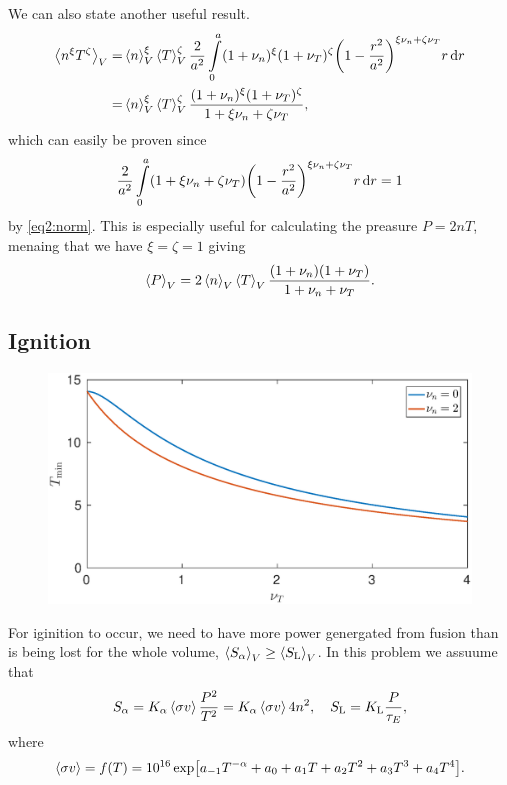 \documentclass[11pt,a4paper, 
swedish, english %
]{article}
\begin{document}
We can also state another useful result.
\begin{equation}
\begin{aligned}
\ev{n^\xi T^\zeta}_V=&\ev{n}_V^\xi\ev{T}_V^\zeta
\frac{2}{a^2}\int_0^a(1+\nu_n)^\xi(1+\nu_T)^\zeta
\qty(1-\frac{r^2}{a^2})^{\xi\nu_n+\zeta\nu_T}r\id{r}\\
=&\ev{n}_V^\xi\ev{T}_V^\zeta
\frac{(1+\nu_n)^\xi(1+\nu_T)^\zeta}{1+\xi\nu_n+\zeta\nu_T},
\end{aligned}
\end{equation}
which can easily be proven since
\begin{equation}
\frac{2}{a^2}\int_0^a(1+\xi\nu_n+\zeta\nu_T)
\qty(1-\frac{r^2}{a^2})^{\xi\nu_n+\zeta\nu_T}r\id{r}
=1
\end{equation}
by \eqref{eq2:norm}.
This is especially useful for calculating the preasure $P=2nT$,
menaing that we have $\xi=\zeta=1$ giving
\begin{equation}\label{eq2:P}
\ev{P}_V=2\ev{n}_V\ev{T}_V
\frac{(1+\nu_n)(1+\nu_T)}{1+\nu_n+\nu_T}.
\end{equation}


\subsection*{Ignition}
\begin{figure}
\centering
\includegraphics[width=14cm]{T_min.eps}
\caption{}
\label{fig:T_min}
\end{figure}

For iginition to occur, we need to have more power genergated from
fusion than is being lost for the whole volume,
$\ev{S_\alpha}_V\ge\ev{S_\text{L}}_V$. In this problem we assuume that
\begin{equation}
S_\alpha = K_\alpha\ev{\sigma v}\frac{P^2}{T^2}
= K_\alpha\ev{\sigma v} 4n^2 \qc
S_\text{L} = K_\text{L} \frac{P}{\tau_E},
\end{equation}
where
\begin{equation}\label{eq:sigma_v}
\ev{\sigma v} = f(T) = 10^{16}
\exp[a_{-1}T^{-\alpha} +a_0 +a_1T +a_2T^2 +a_3T^3 +a_4T^4].
\end{equation}
\end{document}

